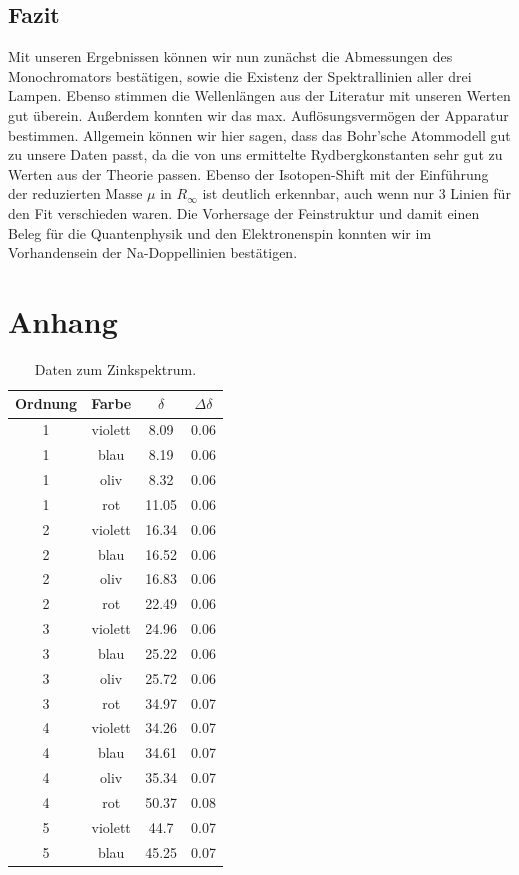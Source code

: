\documentclass[]{article}
\begin{document}
\subsection{Fazit}
Mit unseren Ergebnissen können wir nun zunächst die Abmessungen des Monochromators bestätigen, sowie die Existenz der Spektrallinien aller drei Lampen. Ebenso stimmen die Wellenlängen aus der Literatur mit unseren Werten gut überein. Außerdem konnten wir das max. Auflösungsvermögen der Apparatur bestimmen.
Allgemein können wir hier sagen, dass das Bohr'sche Atommodell gut zu unsere Daten passt, da die von uns ermittelte Rydbergkonstanten sehr gut zu Werten aus der Theorie passen. Ebenso der Isotopen-Shift mit der Einführung der reduzierten Masse $\mu$ in $R_\infty$ ist deutlich erkennbar, auch wenn nur 3 Linien für den Fit verschieden waren. Die Vorhersage der Feinstruktur und damit einen Beleg für die Quantenphysik und den Elektronenspin konnten wir im Vorhandensein der Na-Doppellinien bestätigen.


\section{Anhang}

\begin{table}[H]
\centering
\begin{tabular}{|c|c|c|c|}
\hline
Ordnung & Farbe & $\delta$ & $\Delta\delta$ \\ \hline\hline
1 & violett & 8.09 & 0.06 \\ \hline
1 & blau & 8.19 & 0.06 \\ \hline
1 & oliv & 8.32 & 0.06 \\ \hline
1 & rot & 11.05 & 0.06 \\ \hline
2 & violett & 16.34 & 0.06 \\ \hline
2 & blau & 16.52 & 0.06 \\ \hline
2 & oliv & 16.83 & 0.06 \\ \hline
2 & rot & 22.49 & 0.06 \\ \hline
3 & violett & 24.96 & 0.06 \\ \hline
3 & blau & 25.22 & 0.06 \\ \hline
3 & oliv & 25.72 & 0.06 \\ \hline
3 & rot & 34.97 & 0.07 \\ \hline
4 & violett & 34.26 & 0.07 \\ \hline
4 & blau & 34.61 & 0.07 \\ \hline
4 & oliv & 35.34 & 0.07 \\ \hline
4 & rot & 50.37 & 0.08 \\ \hline
5 & violett & 44.7 & 0.07 \\ \hline
5 & blau & 45.25 & 0.07 \\ \hline
\hline
\end{tabular}
\caption{Daten zum Zinkspektrum.\label{Zn Data}}
\end{table}
\end{document}
